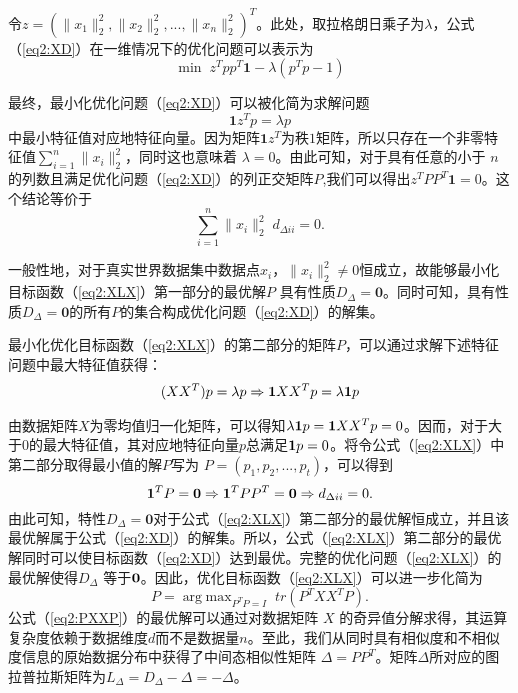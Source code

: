 令$z=(\|x_1\|_2^2, \|x_2\|_2^2, ... , \|x_n\|_2^2)^T$。此处，取拉格朗日乘子为$\lambda$，公式（\ref{eq2:XD}）在一维情况下的优化问题可以表示为
\begin{equation}
	\mathop{\mathrm{min}}\; z^Tpp^T\textbf{1}-\lambda (p^Tp-1)
\end{equation}

最终，最小化优化问题（\ref{eq2:XD}）可以被化简为求解问题
\begin{equation}
	\textbf{1}z^Tp=\lambda p
\end{equation}
中最小特征值对应地特征向量。因为矩阵$\textbf{1}z^T$为秩$1$矩阵，所以只存在一个非零特征值$\sum_{i=1}^{n}\|x_i\|_2^2$，同时这也意味着 $\lambda = 0$。由此可知，对于具有任意的小于 $n$的列数且满足优化问题（\ref{eq2:XD}）的列正交矩阵$P$,我们可以得出$z^TPP^T\textbf{1}=0$。这个结论等价于
\begin{equation}
	\sum_{i=1}^{n} \|x_i\|_2^2\;d_{\Delta ii} = 0.
\end{equation}

一般性地，对于真实世界数据集中数据点$x_i$，$\|x_i\|_2^2\neq0$恒成立，故能够最小化目标函数（\ref{eq2:XLX}）第一部分的最优解$P$ 具有性质$D_\Delta = \textbf{0}$。同时可知，具有性质$D_\Delta = \textbf{0}$的所有$P$的集合构成优化问题（\ref{eq2:XD}）的解集。

最小化优化目标函数（\ref{eq2:XLX}）的第二部分的矩阵$P$，可以通过求解下述特征问题中最大特征值获得：
\begin{equation}
	\begin{split}
		(XX^T)p = \lambda p
		\Rightarrow {\bf1}XX^Tp = \lambda {\bf1}p
	\end{split}
	\label{eq2:Solu}
\end{equation}

由数据矩阵$X$为零均值归一化矩阵，可以得知$\lambda {\bf1}p = {\bf1}XX^Tp = 0$。因而，对于大于$0$的最大特征值，其对应地特征向量$p$总满足${\bf1}p = 0$。将令公式（\ref{eq2:XLX}）中第二部分取得最小值的解$P$写为 $P=(p_1,p_2,...,p_t)$，可以得到
\begin{equation}
	{\bf1}^T P = {\bf0} \Rightarrow {\bf1}^T PP^T = {\bf0} \Rightarrow d_{\Delta ii} = 0. %
\end{equation}
由此可知，特性$D_\Delta = \textbf{0}$对于公式（\ref{eq2:XLX}）第二部分的最优解恒成立，并且该最优解属于公式（\ref{eq2:XD}）的解集。所以，公式（\ref{eq2:XLX}）第二部分的最优解同时可以使目标函数（\ref{eq2:XD}）达到最优。完整的优化问题（\ref{eq2:XLX}）的最优解使得$D_\Delta$ 等于$\bf0$。因此，优化目标函数（\ref{eq2:XLX}）可以进一步化简为
\begin{equation}
	P=\mathop{\mathrm{arg\;max}}_{P^TP=I} \;tr(P^TXX^TP).
	\label{eq2:PXXP}
\end{equation}
公式（\ref{eq2:PXXP}）的最优解可以通过对数据矩阵 $X$ 的奇异值分解求得，其运算复杂度依赖于数据维度$d$而不是数据量$n$。至此，我们从同时具有相似度和不相似度信息的原始数据分布中获得了中间态相似性矩阵 $\Delta = PP^T$。矩阵$\Delta$所对应的图拉普拉斯矩阵为$L_\Delta = D_\Delta-\Delta =-\Delta $。

